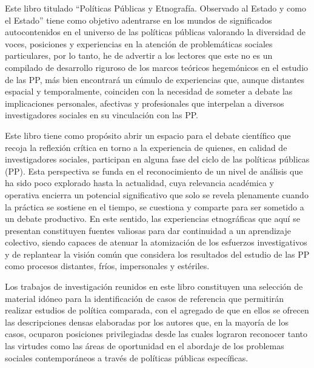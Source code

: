 \documentclass[
  spanish,
  11.5pt,
  170mm x 240mmpaper,
]{scrbook}
\begin{document}
Este libro titulado ``Políticas Públicas y Etnografía. Observado al
Estado y como el Estado'' tiene como objetivo adentrarse en los mundos
de significados autocontenidos en el universo de las políticas públicas
valorando la diversidad de voces, posiciones y experiencias en la
atención de problemáticas sociales particulares, por lo tanto, he de
advertir a los lectores que este no es un compilado de desarrollo
riguroso de los marcos teóricos hegemónicos en el estudio de las PP, más
bien encontrará un cúmulo de experiencias que, aunque distantes espacial
y temporalmente, coinciden con la necesidad de someter a debate las
implicaciones personales, afectivas y profesionales que interpelan a
diversos investigadores sociales en su vinculación con las PP.

Este libro tiene como propósito abrir un espacio para el debate
científico que recoja la reflexión crítica en torno a la experiencia de
quienes, en calidad de investigadores sociales, participan en alguna
fase del ciclo de las políticas públicas (PP). Esta perspectiva se funda
en el reconocimiento de un nivel de análisis que ha sido poco explorado
hasta la actualidad, cuya relevancia académica y operativa encierra un
potencial significativo que solo se revela plenamente cuando la práctica
se sostiene en el tiempo, se cuestiona y comparte para ser sometido a un
debate productivo. En este sentido, las experiencias etnográficas que
aquí se presentan constituyen fuentes valiosas para dar continuidad a un
aprendizaje colectivo, siendo capaces de atenuar la atomización de los
esfuerzos investigativos y de replantear la visión común que considera
los resultados del estudio de las PP como procesos distantes, fríos,
impersonales y estériles.

Los trabajos de investigación reunidos en este libro constituyen una
selección de material idóneo para la identificación de casos de
referencia que permitirán realizar estudios de política comparada, con
el agregado de que en ellos se ofrecen las descripciones densas
elaboradas por los autores que, en la mayoría de los casos, ocuparon
posiciones privilegiadas desde las cuales lograron reconocer tanto las
virtudes como las áreas de oportunidad en el abordaje de los problemas
sociales contemporáneos a través de políticas públicas específicas.
\end{document}
